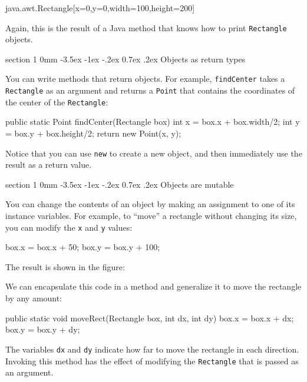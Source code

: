 \documentclass{book}
\makeatletter
\renewcommand{\section}{\@startsection 
    {section} {1} {0mm}%
    {-3.5ex \@plus -1ex \@minus -.2ex}%
    {0.7ex \@plus.2ex}%
    {\normalfont\Large\bfseries}}
\makeatother
\begin{document}
\begin{verbatimtab}
java.awt.Rectangle[x=0,y=0,width=100,height=200]
\end{verbatimtab}
%
Again, this is the result of a Java method that knows how
to print {\tt Rectangle} objects.


\section{Objects as return types}

You can write methods that return objects.  For example,
{\tt findCenter} takes a {\tt Rectangle} as an argument and
returns a {\tt Point} that contains the coordinates of the
center of the {\tt Rectangle}:

\begin{verbatimtab}
  public static Point findCenter(Rectangle box) {
    int x = box.x + box.width/2;
    int y = box.y + box.height/2;
    return new Point(x, y);
  }
\end{verbatimtab}
%
Notice that you can use {\tt new} to create a new object,
and then immediately use the result as a return value.


\section{Objects are mutable}

You can change the contents of an object by making an assignment
to one of its instance variables.  For example, to ``move''
a rectangle without changing its size, you can modify the
{\tt x} and {\tt y} values:

\begin{verbatimtab}
    box.x = box.x + 50;
    box.y = box.y + 100;
\end{verbatimtab}
%
The result is shown in the figure:





We can encapsulate this code in a method and
generalize it to move the rectangle by any amount:

\begin{verbatimtab}
  public static void moveRect(Rectangle box, int dx, int dy) {
    box.x = box.x + dx;
    box.y = box.y + dy;
  }
\end{verbatimtab}
%
The variables {\tt dx} and {\tt dy} indicate how far to move the
rectangle in each direction.  Invoking this method has the effect of
modifying the {\tt Rectangle} that is passed as an argument.
\end{document}
